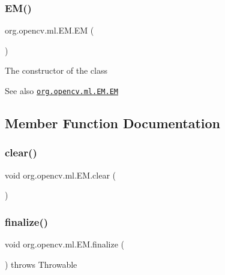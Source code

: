 \subsubsection{\texorpdfstring{E\+M()}{EM()}\hspace{0.1cm}{\footnotesize\ttfamily [3/3]}}
{\footnotesize\ttfamily org.\+opencv.\+ml.\+E\+M.\+EM (\begin{DoxyParamCaption}{ }\end{DoxyParamCaption})}

The constructor of the class

\begin{DoxySeeAlso}{See also}
\href{http://docs.opencv.org/modules/ml/doc/expectation_maximization.html#em-em}{\tt org.\+opencv.\+ml.\+E\+M.\+EM} 
\end{DoxySeeAlso}


\subsection{Member Function Documentation}
\mbox{\label{classorg_1_1opencv_1_1ml_1_1_e_m_a80353ccd1a12c8d774c2d597fd3c450e}} 
\subsubsection{\texorpdfstring{clear()}{clear()}}
{\footnotesize\ttfamily void org.\+opencv.\+ml.\+E\+M.\+clear (\begin{DoxyParamCaption}{ }\end{DoxyParamCaption})}

\mbox{\label{classorg_1_1opencv_1_1ml_1_1_e_m_a0920161a9a241962ea606e0aa7098c10}} 
\subsubsection{\texorpdfstring{finalize()}{finalize()}}
{\footnotesize\ttfamily void org.\+opencv.\+ml.\+E\+M.\+finalize (\begin{DoxyParamCaption}{ }\end{DoxyParamCaption}) throws Throwable\hspace{0.3cm}{\ttfamily [protected]}}

